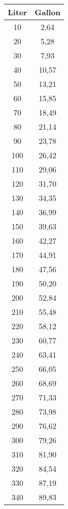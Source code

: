 \begin{table}[!ht]
  \centering
  \tiny
  \begin{tabular}{|c|c|}
  \hline
  \cellcolor{black!90}\color{white}\textbf{Liter} & \cellcolor{black!90}\color{white}\textbf{Gallon} \\ \hline
      10 & 2,64 \\ \hline
      20 & 5,28 \\ \hline
      30 & 7,93 \\ \hline
      40 & 10,57 \\ \hline
      50 & 13,21 \\ \hline
      60 & 15,85 \\ \hline
      70 & 18,49 \\ \hline
      80 & 21,14 \\ \hline
      90 & 23,78 \\ \hline
      100 & 26,42 \\ \hline
      110 & 29,06 \\ \hline
      120 & 31,70 \\ \hline
      130 & 34,35 \\ \hline
      140 & 36,99 \\ \hline
      150 & 39,63 \\ \hline
      160 & 42,27 \\ \hline
      170 & 44,91 \\ \hline
      180 & 47,56 \\ \hline
      190 & 50,20 \\ \hline
      200 & 52,84 \\ \hline
      210 & 55,48 \\ \hline
      220 & 58,12 \\ \hline
      230 & 60,77 \\ \hline
      240 & 63,41 \\ \hline
      250 & 66,05 \\ \hline
      260 & 68,69 \\ \hline
      270 & 71,33 \\ \hline
      280 & 73,98 \\ \hline
      290 & 76,62 \\ \hline
      300 & 79,26 \\ \hline
      310 & 81,90 \\ \hline
      320 & 84,54 \\ \hline
      330 & 87,19 \\ \hline
      340 & 89,83 \\ \hline

\end{tabular}
\end{table}
